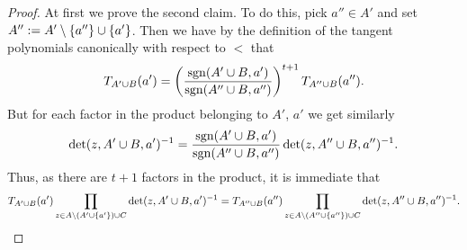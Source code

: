 \documentclass[a4paper]{article}
\begin{document}
\begin{proof}
  At first we prove the second claim. To do this, pick $a''\in A'$ and
  set $A'':=A'\setminus\{a''\}\cup\{a'\}$. Then we have by the
  definition of the tangent polynomials canonically with respect to $<$ that
  \begin{equation}
    T_{A'\cup B}(a') = \left(\frac{\mathop\mathrm{sgn}(A'\cup B,a')}{\mathop\mathrm{sgn}(A''\cup B,a'')}\right)^{t+1}T_{A''\cup B}(a'')\text{.}
  \end{equation}
  But for each factor in the product belonging to $A'$, $a'$ we get similarly
  \begin{equation}
    \det(z,A'\cup B,a')^{-1}=\frac{\mathop\mathrm{sgn}(A'\cup B,a')}{\mathop\mathrm{sgn}(A''\cup B,a'')}\det(z,A''\cup B,a'')^{-1}\text{.}
  \end{equation}
  Thus, as there are $t+1$ factors in the product, it is immediate that 
  \begin{align*}
    T_{A'\cup B}(a')\prod_{z\in A\setminus (A'\cup\{a'\})\cup C}\det(z,A'\cup B,a')^{-1} = T_{A''\cup B}(a'')\prod_{z\in A\setminus (A''\cup\{a''\})\cup C}\det(z,A''\cup B,a'')^{-1}\text{.}
  \end{align*}


\end{proof}
\end{document}
